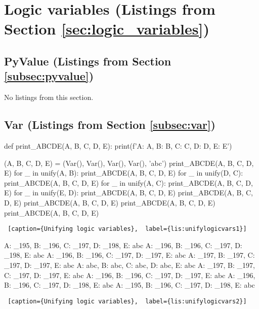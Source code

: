 \section{Logic variables (Listings from Section \ref{sec:logic_variables})} \label{appsec:logic_variables} 

\subsection{PyValue (Listings from Section \ref{subsec:pyvalue})} \label{appsubsec:pyvalue}
No listings from this section.

\subsection{Var (Listings from Section \ref{subsec:var})} \label{appsubsec:var}

\begin{minipage}{\linewidth}   \hrulefill
\begin{python}[numbers=left]
def print_ABCDE(A, B, C, D, E):
    print(f'A: {A}, B: {B}, C: {C}, D: {D}, E: {E}')

(A, B, C, D, E) = (Var(), Var(), Var(), Var(), 'abc')
print_ABCDE(A, B, C, D, E) 
for _ in unify(A, B):
  print_ABCDE(A, B, C, D, E) 
  for _ in unify(D, C):
    print_ABCDE(A, B, C, D, E) 
    for _ in unify(A, C):
      print_ABCDE(A, B, C, D, E) 
      for _ in unify(E, D):
        print_ABCDE(A, B, C, D, E) 
      print_ABCDE(A, B, C, D, E) 
    print_ABCDE(A, B, C, D, E) 
  print_ABCDE(A, B, C, D, E) 
print_ABCDE(A, B, C, D, E) 
\end{python}
\begin{lstlisting} [caption={Unifying logic variables},  label={lis:unifylogicvars1}]
\end{lstlisting}
\end{minipage}

\noindent
\begin{minipage}{\linewidth} \largev  
\begin{python}[numbers=left]
A: _195, B: _196, C: _197, D: _198, E: abc
A: _196, B: _196, C: _197, D: _198, E: abc
A: _196, B: _196, C: _197, D: _197, E: abc
A: _197, B: _197, C: _197, D: _197, E: abc
A: abc, B: abc, C: abc, D: abc, E: abc
A: _197, B: _197, C: _197, D: _197, E: abc
A: _196, B: _196, C: _197, D: _197, E: abc
A: _196, B: _196, C: _197, D: _198, E: abc
A: _195, B: _196, C: _197, D: _198, E: abc
\end{python}
\begin{lstlisting} [caption={Unifying logic variables},  label={lis:unifylogicvars2}]
\end{lstlisting}
\end{minipage}

